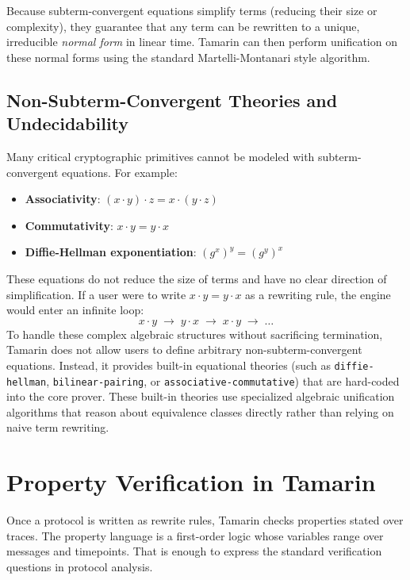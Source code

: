 Because subterm-convergent equations simplify terms (reducing their size or complexity), they guarantee that any term can be rewritten to a unique, irreducible \emph{normal form} in linear time. Tamarin can then perform unification on these normal forms using the standard Martelli-Montanari style algorithm.

\subsection{Non-Subterm-Convergent Theories and Undecidability}

Many critical cryptographic primitives cannot be modeled with subterm-convergent equations. For example:
\begin{itemize}
  \item \textbf{Associativity}: $(x \cdot y) \cdot z = x \cdot (y \cdot z)$
  \item \textbf{Commutativity}: $x \cdot y = y \cdot x$
  \item \textbf{Diffie-Hellman exponentiation}: $(g^x)^y = (g^y)^x$
\end{itemize}
These equations do not reduce the size of terms and have no clear direction of simplification. If a user were to write $x \cdot y = y \cdot x$ as a rewriting rule, the engine would enter an infinite loop:
\[
  x \cdot y \;\longrightarrow\; y \cdot x \;\longrightarrow\; x \cdot y \;\longrightarrow\; \dots
\]
To handle these complex algebraic structures without sacrificing termination, Tamarin does not allow users to define arbitrary non-subterm-convergent equations. Instead, it provides built-in equational theories (such as \texttt{diffie-hellman}, \texttt{bilinear-pairing}, or \texttt{associative-commutative}) that are hard-coded into the core prover. These built-in theories use specialized algebraic unification algorithms that reason about equivalence classes directly rather than relying on naive term rewriting.

\section{Property Verification in Tamarin}
\label{sec:tamarin-properties}

Once a protocol is written as rewrite rules, Tamarin checks properties stated
over traces.  The property language is a first-order logic whose variables
range over messages and timepoints.  That is enough to express the standard
verification questions in protocol analysis.

